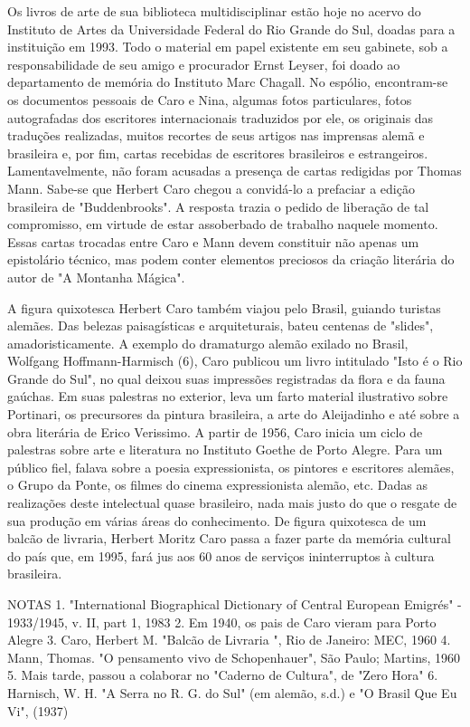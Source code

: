 Os livros de arte de sua biblioteca multidisciplinar estão hoje no acervo do Instituto de Artes da Universidade Federal do Rio Grande do Sul, doadas para a instituição em 1993.
Todo o material em papel existente em seu gabinete, sob a responsabilidade de seu amigo e procurador Ernst Leyser, foi doado ao departamento de memória do Instituto Marc Chagall.
No espólio, encontram-se os documentos pessoais de Caro e Nina, algumas fotos particulares, fotos autografadas dos escritores internacionais traduzidos por ele, os originais das traduções realizadas, muitos recortes de seus artigos nas imprensas alemã e brasileira e, por fim, cartas recebidas de escritores brasileiros e estrangeiros.
Lamentavelmente, não foram acusadas a presença de cartas redigidas por Thomas Mann. Sabe-se que Herbert Caro chegou a convidá-lo a prefaciar a edição brasileira de "Buddenbrooks". A resposta trazia o pedido de liberação de tal compromisso, em virtude de estar assoberbado de trabalho naquele momento. Essas cartas trocadas entre Caro e Mann devem constituir não apenas um epistolário técnico, mas podem conter elementos preciosos da criação literária do autor de "A Montanha Mágica".

A figura quixotesca 
Herbert Caro também viajou pelo Brasil, guiando turistas alemães. Das belezas paisagísticas e arquiteturais, bateu centenas de "slides", amadoristicamente. A exemplo do dramaturgo alemão exilado no Brasil, Wolfgang Hoffmann-Harmisch (6), Caro publicou um livro intitulado "Isto é o Rio Grande do Sul", no qual deixou suas impressões registradas da flora e da fauna gaúchas.
Em suas palestras no exterior, leva um farto material ilustrativo sobre Portinari, os precursores da pintura brasileira, a arte do Aleijadinho e até sobre a obra literária de Erico Verissimo. A partir de 1956, Caro inicia um ciclo de palestras sobre arte e literatura no Instituto Goethe de Porto Alegre. Para um público fiel, falava sobre a poesia expressionista, os pintores e escritores alemães, o Grupo da Ponte, os filmes do cinema expressionista alemão, etc.
Dadas as realizações deste intelectual quase brasileiro, nada mais justo do que o resgate de sua produção em várias áreas do conhecimento. De figura quixotesca de um balcão de livraria, Herbert Moritz Caro passa a fazer parte da memória cultural do país que, em 1995, fará jus aos 60 anos de serviços ininterruptos à cultura brasileira.

NOTAS
1. "International Biographical Dictionary of Central European Emigrés" - 1933/1945, v. II, part 1, 1983
2. Em 1940, os pais de Caro vieram para Porto Alegre
3. Caro, Herbert M. "Balcão de Livraria ", Rio de Janeiro: MEC, 1960
4. Mann, Thomas. "O pensamento vivo de Schopenhauer", São Paulo; Martins, 1960
5. Mais tarde, passou a colaborar no "Caderno de Cultura", de "Zero Hora"
6. Harnisch, W. H. "A Serra no R. G. do Sul" (em alemão, s.d.) e "O Brasil Que Eu Vi", (1937)

